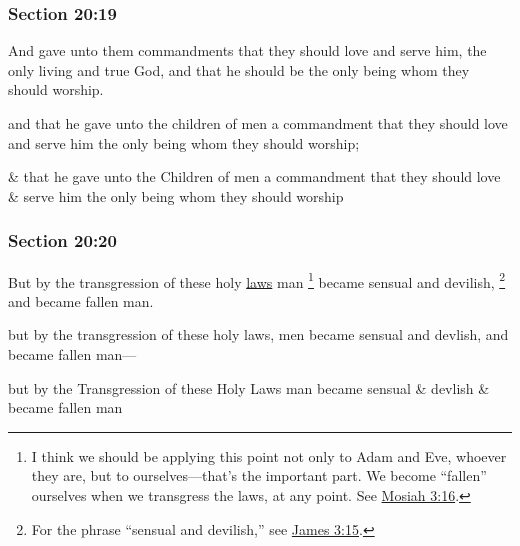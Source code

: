 	\subsubsection{Section 20:19} %
		\label{DC20-19}

		And gave unto them commandments that they should love and serve him, the only living and true God, and that he should be the only being whom they should worship.

		\begin{framed}
		\scriptsize
			\begin{compactdesc}
				\item[JSP] and that he gave unto the children of men a commandment that they should love and serve him the only being whom they should worship;
				\item[RB1] \& that he gave unto the Children of men a commandment that they should love \& serve him the only being whom they should worship
			\end{compactdesc}
		\end{framed}

	\subsubsection{Section 20:20} %
		\label{DC20-20}

		But by the transgression of these holy \hyperref[LAW]{laws} man%
			\footnote{%
				I think we should be applying this point not only to Adam and Eve, whoever they are, but to ourselves---that's the important part. We become ``fallen'' ourselves when we transgress the laws, at any point. See \hyperref[MOSIAH-3-16]{Mosiah 3:16}.
				}
		became sensual and devilish,%
			\footnote{%
				For the phrase ``sensual and devilish,'' see \hyperref[JAMES-3-15]{James 3:15}.
				}
		and became fallen man.

		\begin{framed}
		\scriptsize
			\begin{compactdesc}
				\item[JSP] but by the transgression of these holy laws, men became sensual and devlish, and became fallen man---
				\item[RB1] but by the Transgression of these Holy Laws man became sensual \& devlish \& became fallen man
			\end{compactdesc}
		\end{framed}

